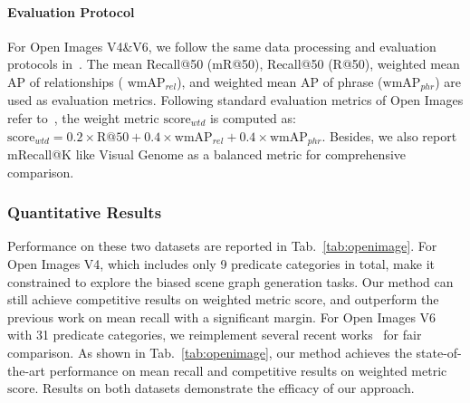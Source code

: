\vspace{-4mm}
\paragraph{Evaluation Protocol}\label{subsec:eval_prot}
For Open Images  V4\&V6, we follow the same data processing and evaluation protocols in~\cite{zhang_graphical_2019, OpenImages, lin_gps-net_2020}. 
The mean Recall@50 (mR@50), Recall@50 (R@50), weighted mean AP of relationships ( $\text{wmAP}_{rel}$), and weighted mean AP of phrase ($\text{wmAP}_{phr}$) are used as evaluation metrics. 
Following standard evaluation metrics of Open Images refer to~\cite{OpenImages, zhang_graphical_2019, lin_gps-net_2020}, the weight metric $\text{score}_{wtd}$ is computed as: $\text{score}_{wtd} = 0.2 \times \text{R}@50 +0.4 \times \text{wmAP}_{rel} + 0.4 \times \text{wmAP}_{phr}$.
Besides, we also report mRecall@K like Visual Genome as a balanced metric for comprehensive comparison.



\subsubsection{Quantitative Results}


Performance on these two datasets are reported in Tab.~\ref{tab:openimage}. 
For Open Images V4, which includes only 9 predicate categories in total, make it constrained to explore the biased scene graph generation tasks. 
Our method can still achieve competitive results on weighted metric $\text{score}$, and outperform the previous work on mean recall with a significant margin.
For Open Images V6 with 31 predicate categories,
we reimplement several recent works~\cite{lin_gps-net_2020,tang_unbiased_2020, tang_learning_2018, zellers_neural_2017, yang_graph_2018} for fair comparison. As shown in Tab.~\ref{tab:openimage}, our method achieves the state-of-the-art performance on mean recall and competitive results on weighted metric $\text{score}$. Results on both datasets demonstrate the efficacy of our approach.
%



